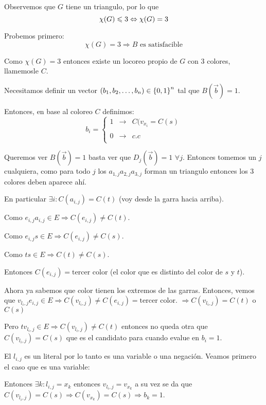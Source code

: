 \documentclass[12pt,a4paper]{article}
\begin{document}
Observemos que $G$ tiene un triangulo, por lo que
$$\chi(G) \leqslant 3 \Leftrightarrow \chi(G) = 3$$

Probemos primero:
$$\chi(G) = 3 \Rightarrow B \text{ es satisfacible}$$

Como $\chi (G) = 3$ entonces existe un locoreo propio de $G$ con $3$ colores, 
llamemosle $C$.
\medskip

Necesitamos definir un vector $(b_{1},b_{2},\ldots ,b_{n}) \in \left\lbrace 0,1 \right\rbrace^{n}$ 
tal que $B(\overrightarrow{b}) = 1$.
\medskip

Entonces, en base al coloreo $C$ definimos:
$$b_{i}= \left\{ \begin{array}{lcc}
    1 & \to & C(v_{x_{i}} = C(s) \\
    \\ 0& \to & c.c\\
    \end{array}
    \right.$$

Queremos ver $B(\overrightarrow{b}) = 1$ basta ver que $D_{j}(\overrightarrow{b}) = 1\,\, \forall j$. 
Entonces tomemos un $j$ cualquiera, como para todo $j$ los $a_{1,j}a_{2,j}a_{3,j}$ 
forman un triangulo entonces los $3$ colores deben aparece ahí.
\medskip

En particular $\exists i: C(a_{i,j}) = C(t)$ (voy desde la garra hacia arriba). 
\medskip

Como $e_{i,j}a_{i,j} \in E \Rightarrow C(e_{i,j}) \neq C(t)$.
\medskip

Como $e_{i,j}s \in E \Rightarrow C(e_{i,j}) \neq C(s)$.
\medskip

Como $ts \in E \Rightarrow C(t) \neq C(s)$.
\medskip

Entonces $C(e_{i,j}) = \text{tercer color}$ (el color que es distinto del color de 
$s$ y $t$).
\medskip

Ahora ya sabemos que color tienen los extremos de las garras. Entonces, vemos que
$v_{l_{i},j}e_{i,j} \in E \Rightarrow C(v_{l_{i},j}) \neq C(e_{i,j}) = \text{tercer color}$.
$\Rightarrow C(v_{l_{i},j}) = C(t)$ o $C(s)$
\medskip

Pero $tv_{l_{i},j} \in E \Rightarrow C(v_{l_{i},j})\neq C(t)$ entonces no queda 
otra que $C(v_{l_{i},j}) = C(s)$ que es el candidato para cuando evalue en $b_{i}=1$.
\medskip

El $l_{i,j}$ es un literal por lo tanto es una variable o una negación. Veamos 
primero el caso que es una variable:
\medskip

Entonces $\exists k : l_{i,j} = x_{k}$ entonces $v_{l_{i},j} = v_{x_{k}}$ a su vez 
se da que $C(v_{l_{i},j}) = C(s) \Rightarrow C(v_{x_{k}}) = C(s) \Rightarrow b_{k} = 1$.
\medskip
\end{document}
